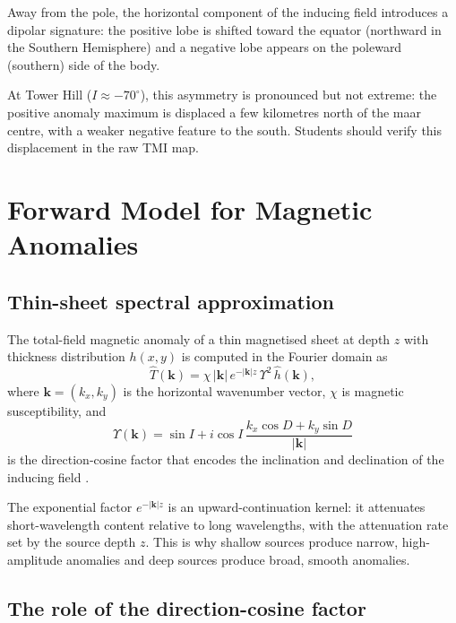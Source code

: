 \documentclass[11pt,a4paper]{article}
\begin{document}
Away from the pole, the horizontal component of the inducing field
introduces a dipolar signature: the positive lobe is shifted toward the
equator (northward in the Southern Hemisphere) and a negative lobe appears
on the poleward (southern) side of the body.

At Tower Hill ($I \approx -70^\circ$), this asymmetry is pronounced but not
extreme: the positive anomaly maximum is displaced a few kilometres
north of the maar centre, with a weaker negative feature to the south.
Students should verify this displacement in the raw TMI map.

\section{Forward Model for Magnetic Anomalies}

\subsection{Thin-sheet spectral approximation}

The total-field magnetic anomaly of a thin magnetised sheet at depth $z$
with thickness distribution $h(x,y)$ is computed in the Fourier domain as
\begin{equation}
\hat{T}(\mathbf{k})
  = \chi\,|\mathbf{k}|\,e^{-|\mathbf{k}|z}\,\Upsilon^2\,\hat{h}(\mathbf{k}),
\end{equation}
where $\mathbf{k} = (k_x, k_y)$ is the horizontal wavenumber vector,
$\chi$ is magnetic susceptibility, and
\begin{equation}
\Upsilon(\mathbf{k})
  = \sin I
    + i\cos I\,
      \frac{k_x\cos D + k_y\sin D}{|\mathbf{k}|}
\end{equation}
is the direction-cosine factor that encodes the inclination and declination
of the inducing field \citep{Blakely1995}.

The exponential factor $e^{-|\mathbf{k}|z}$ is an upward-continuation kernel:
it attenuates short-wavelength content relative to long wavelengths, with
the attenuation rate set by the source depth $z$.
This is why shallow sources produce narrow, high-amplitude anomalies and deep
sources produce broad, smooth anomalies.

\subsection{The role of the direction-cosine factor}
\end{document}
